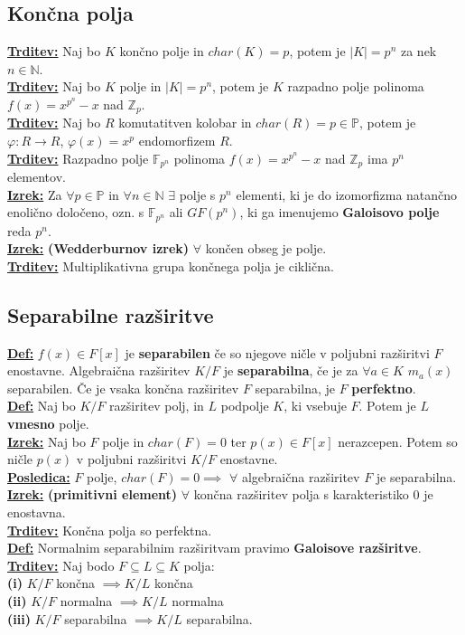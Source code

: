 \documentclass[a4paper,oneside,8pt,landscape]{extarticle}
\renewcommand{\phi}{\varphi}
\let\oldtextbf\textbf
\renewcommand{\textbf}[1]{\oldtextbf{\boldmath #1}}
\newcommand{\definicija}[1]{\textbf{\underline{Def:} }{#1}\\}
\newcommand{\trditev}[1]{\textbf{\underline{Trditev:} }{#1}\\}
\newcommand{\posledica}[1]{\textbf{\underline{Posledica:} }{#1}\\}
\newcommand{\izrek}[1]{\textbf{\underline{Izrek:} }{#1}\\}
\newcommand{\bt}[1]{\textbf{#1}}
\begin{document}
\begin{multicols*}{3}
\subsection*{Končna polja}
\trditev{Naj bo $K$ končno polje in $char(K)=p$, potem je $|K|=p^n$ za nek $n\in \mathbb{N}$. }
\trditev{Naj bo $K$ polje in $|K| = p^n$, potem je $K$ razpadno polje polinoma $f(x)=x^{p^n}-x$ nad $\mathbb{Z}_p$.}
\trditev{Naj bo $R$ komutatitven kolobar in $char(R) = p\in\mathbb{P}$, potem je $\phi :R\to R$, $\phi(x) = x^p$ endomorfizem $R$.}
\trditev{Razpadno polje $\mathbb{F}_{p^n}$ polinoma $f(x)=x^{p^n}-x$ nad $\mathbb{Z}_p$ ima $p^n$ elementov.}
\izrek{Za $\forall p\in \mathbb{P}$ in $\forall n\in \mathbb{N}$ $\exists$ polje s $p^n$ elementi, ki je do izomorfizma natančno enolično določeno, ozn. s $\mathbb{F}_{p^n}$ ali $GF(p^n)$, ki ga imenujemo  \bt{Galoisovo polje} reda $p^n$.}
\izrek{\bt{(Wedderburnov izrek)} $\forall$ končen obseg je polje.}
\trditev{Multiplikativna grupa končnega polja je ciklična.}
\vspace{-15pt}
\subsection*{Separabilne razširitve}
\definicija{$f(x)\in F[x]$ je \bt{separabilen} če so njegove ničle v poljubni razširitvi $F$ enostavne. Algebraična razširitev $K/F$ je \bt{separabilna}, če je za $\forall a\in K$ $m_a(x)$ separabilen. Če je vsaka končna razširitev $F$ separabilna, je $F$ \bt{perfektno}.}
\definicija{Naj bo $K/F$ razširitev polj, in $L$ podpolje $K$, ki vsebuje $F$. Potem je $L$ \bt{vmesno} polje.}
\izrek{Naj bo $F$ polje in $char(F)=0$ ter $p(x)\in F[x]$ nerazcepen. Potem so ničle $p(x)$ v poljubni razširitvi $K/F$ enostavne.}
\posledica{$F$ polje, $char(F)=0 \implies$ $\forall$ algebraična razširitev $F$ je separabilna.}
\izrek{\bt{(primitivni element)} $\forall$ končna razširitev polja s karakteristiko $0$ je enostavna.}
\trditev{Končna polja so perfektna.}
\definicija{Normalnim separabilnim razširitvam pravimo \bt{Galoisove razširitve}.}
\trditev{Naj bodo $F\subseteq L \subseteq K$ polja: \\
\bt{(i)} $K/F$ končna $\implies K/L$ končna \\
\bt{(ii)} $K/F$ normalna $\implies K/L$ normalna \\
\bt{(iii)} $K/F$ separabilna $\implies K/L$ separabilna.}
\vspace{-15pt}

\end{multicols*}
\end{document}
